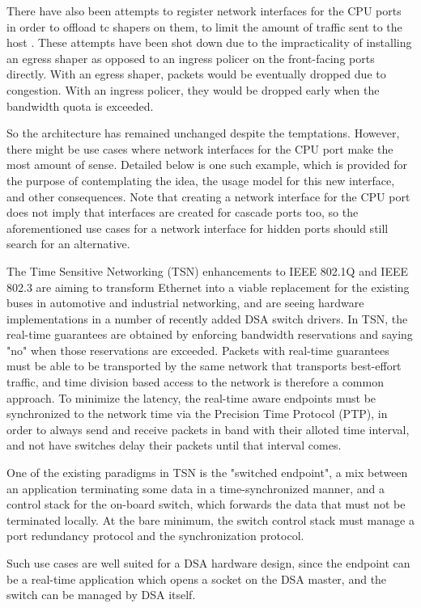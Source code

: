 \documentclass[letterpaper]{article}
\begin{document}
There have also been attempts to register network interfaces for the CPU ports
in order to offload tc shapers on them, to limit the amount of traffic sent to
the host \cite{dsa-tc-cpu-port}. These attempts have been shot down due to the
impracticality of installing an egress shaper as opposed to an ingress policer
on the front-facing ports directly. With an egress shaper, packets would be
eventually dropped due to congestion. With an ingress policer, they would be
dropped early when the bandwidth quota is exceeded.

So the architecture has remained unchanged despite the temptations. However,
there might be use cases where network interfaces for the CPU port make the
most amount of sense. Detailed below is one such example, which is provided for
the purpose of contemplating the idea, the usage model for this new interface,
and other consequences. Note that creating a network interface for the CPU port
does not imply that interfaces are created for cascade ports too, so the
aforementioned use cases for a network interface for hidden ports should still
search for an alternative.

The Time Sensitive Networking (TSN) enhancements to IEEE 802.1Q and IEEE 802.3
are aiming to transform Ethernet into a viable replacement for the existing
buses in automotive and industrial networking, and are seeing hardware
implementations in a number of recently added DSA switch drivers. In TSN, the
real-time guarantees are obtained by enforcing bandwidth reservations and
saying "no" when those reservations are exceeded. Packets with real-time
guarantees must be able to be transported by the same network that transports
best-effort traffic, and time division based access to the network is therefore
a common approach. To minimize the latency, the real-time aware endpoints must
be synchronized to the network time via the Precision Time Protocol (PTP), in
order to always send and receive packets in band with their alloted time
interval, and not have switches delay their packets until that interval comes.

One of the existing paradigms in TSN is the "switched endpoint", a mix between
an application terminating some data in a time-synchronized manner, and a
control stack for the on-board switch, which forwards the data that must not be
terminated locally. At the bare minimum, the switch control stack must manage a
port redundancy protocol and the synchronization protocol.

Such use cases are well suited for a DSA hardware design, since the endpoint
can be a real-time application which opens a socket on the DSA master, and the
switch can be managed by DSA itself.
\end{document}
